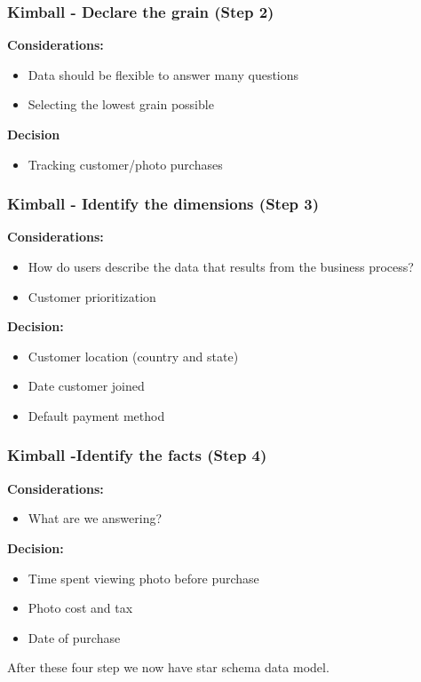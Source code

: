 \subsubsection{Kimball - Declare the grain (Step 2)}
\textbf{Considerations:}
\begin{itemize}
    \item Data should be flexible to answer many questions
    \item Selecting the lowest grain possible
\end{itemize}
\textbf{Decision}
\begin{itemize}
    \item Tracking customer/photo purchases
\end{itemize}

\subsubsection{Kimball - Identify the dimensions (Step 3)}
\textbf{Considerations:}
\begin{itemize}
    \item How do users describe the data that results from the business process?
    \item Customer prioritization
\end{itemize}
\textbf{Decision:}
\begin{itemize}
    \item Customer location (country and state)
    \item Date customer joined
    \item Default payment method
\end{itemize}

\subsubsection{Kimball -Identify the facts (Step 4)}
\textbf{Considerations:}
\begin{itemize}
    \item What are we answering?
\end{itemize}
\textbf{Decision:}
\begin{itemize}
    \item Time spent viewing photo before purchase
    \item Photo cost and tax
    \item Date of purchase
\end{itemize}

After these four step we now have star schema data model.

